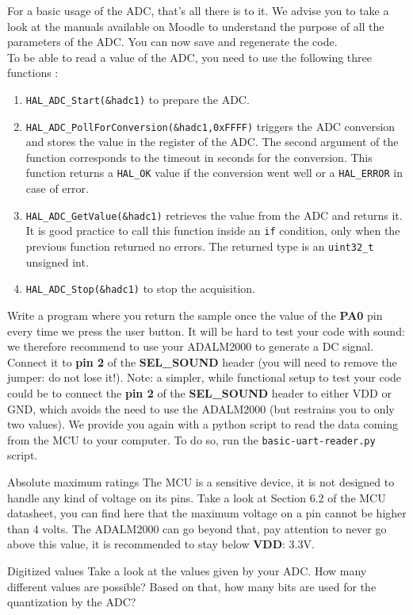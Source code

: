 For a basic usage of the ADC, that's all there is to it. We advise you to take a look at the manuals available on Moodle to understand the purpose of all the parameters of the ADC. You can now save and regenerate the code.\\

\noindent To be able to read a value of the ADC, you need to use the following three functions :
\begin{enumerate}
    \item \texttt{HAL\_ADC\_Start(\&hadc1)} to prepare the ADC.
    \item \texttt{HAL\_ADC\_PollForConversion(\&hadc1,0xFFFF)} triggers the ADC conversion and stores the value in the register of the ADC. The second argument of the function corresponds to the timeout in seconds for the conversion. This function returns a \texttt{HAL\_OK} value if the conversion went well or a \texttt{HAL\_ERROR} in case of error.
    \item \texttt{HAL\_ADC\_GetValue(\&hadc1)} retrieves the value from the ADC and returns it. It is good practice to call this function inside an \texttt{if} condition, only when the previous function returned no errors. The returned type is an \texttt{uint32\_t} unsigned int.
    \item \texttt{HAL\_ADC\_Stop(\&hadc1)} to stop the acquisition.
 \end{enumerate}

\noindent Write a program where you return the sample once the value of the \textbf{PA0} pin every time we press the user button. It will be hard to test your code with sound: we therefore recommend to use your ADALM2000 to generate a DC signal. Connect it to \textbf{pin 2} of the \textbf{SEL\_SOUND} header (you will need to remove the jumper: do not lose it!). Note: a simpler, while functional setup to test your code could be to connect the \textbf{pin 2} of the \textbf{SEL\_SOUND} header to either VDD or GND, which avoids the need to use the ADALM2000 (but restrains you to only two values). We provide you again with a python script to read the data coming from the MCU to your computer. To do so, run the \texttt{basic-uart-reader.py} script.\\
\begin{bclogo}[couleur = gray!20, arrondi = 0.2, logo=\bcattention]{Absolute maximum ratings}
The MCU is a sensitive device, it is not designed to handle any kind of voltage on its pins. Take a look at Section 6.2 of the MCU datasheet, you can find here that the maximum voltage on a pin cannot be higher than 4 volts. The ADALM2000 can go beyond that, pay attention to never go above this value, it is recommended to stay below \textbf{VDD}: 3.3V.
\end{bclogo}
\begin{bclogo}[couleur = gray!20, arrondi = 0.2, logo=\bcquestion]{Digitized values}
Take a look at the values given by your ADC. How many different values are possible? Based on that, how many bits are used for the quantization by the ADC?
\end{bclogo}

